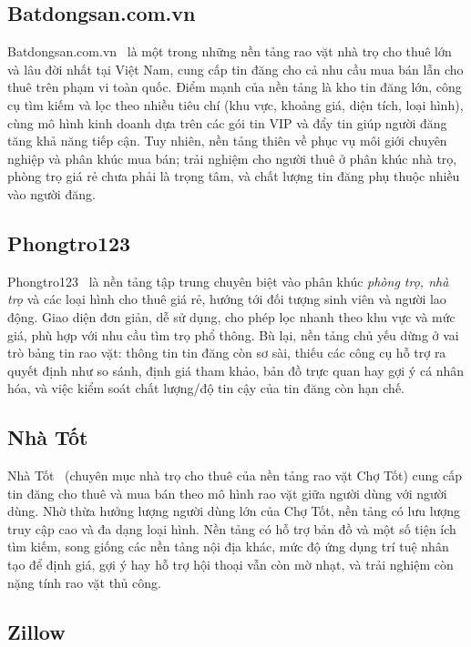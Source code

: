 \FloatBarrier
\subsection{Batdongsan.com.vn}

Batdongsan.com.vn~\cite{Batdongsan} là một trong những nền tảng rao vặt nhà trọ cho thuê lớn và lâu đời nhất tại Việt Nam, cung cấp tin đăng cho cả nhu cầu mua bán lẫn cho thuê trên phạm vi toàn quốc. Điểm mạnh của nền tảng là kho tin đăng lớn, công cụ tìm kiếm và lọc theo nhiều tiêu chí (khu vực, khoảng giá, diện tích, loại hình), cùng mô hình kinh doanh dựa trên các gói tin VIP và đẩy tin giúp người đăng tăng khả năng tiếp cận. Tuy nhiên, nền tảng thiên về phục vụ môi giới chuyên nghiệp và phân khúc mua bán; trải nghiệm cho người thuê ở phân khúc nhà trọ, phòng trọ giá rẻ chưa phải là trọng tâm, và chất lượng tin đăng phụ thuộc nhiều vào người đăng.

\FloatBarrier
\subsection{Phongtro123}

Phongtro123~\cite{Phongtro123} là nền tảng tập trung chuyên biệt vào phân khúc \textit{phòng trọ, nhà trọ} và các loại hình cho thuê giá rẻ, hướng tới đối tượng sinh viên và người lao động. Giao diện đơn giản, dễ sử dụng, cho phép lọc nhanh theo khu vực và mức giá, phù hợp với nhu cầu tìm trọ phổ thông. Bù lại, nền tảng chủ yếu dừng ở vai trò bảng tin rao vặt: thông tin tin đăng còn sơ sài, thiếu các công cụ hỗ trợ ra quyết định như so sánh, định giá tham khảo, bản đồ trực quan hay gợi ý cá nhân hóa, và việc kiểm soát chất lượng/độ tin cậy của tin đăng còn hạn chế.

\FloatBarrier
\subsection{Nhà Tốt}

Nhà Tốt~\cite{NhaTot} (chuyên mục nhà trọ cho thuê của nền tảng rao vặt Chợ Tốt) cung cấp tin đăng cho thuê và mua bán theo mô hình rao vặt giữa người dùng với người dùng. Nhờ thừa hưởng lượng người dùng lớn của Chợ Tốt, nền tảng có lưu lượng truy cập cao và đa dạng loại hình. Nền tảng có hỗ trợ bản đồ và một số tiện ích tìm kiếm, song giống các nền tảng nội địa khác, mức độ ứng dụng trí tuệ nhân tạo để định giá, gợi ý hay hỗ trợ hội thoại vẫn còn mờ nhạt, và trải nghiệm còn nặng tính rao vặt thủ công.

\FloatBarrier
\subsection{Zillow}


